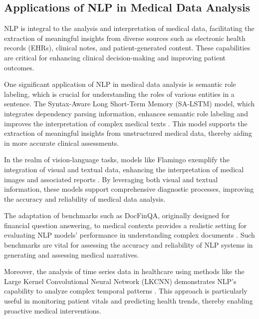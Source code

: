 \subsection{Applications of NLP in Medical Data Analysis} \label{subsec:Applications of NLP in Medical Data Analysis}



NLP is integral to the analysis and interpretation of medical data, facilitating the extraction of meaningful insights from diverse sources such as electronic health records (EHRs), clinical notes, and patient-generated content. These capabilities are critical for enhancing clinical decision-making and improving patient outcomes.



One significant application of NLP in medical data analysis is semantic role labeling, which is crucial for understanding the roles of various entities in a sentence. The Syntax-Aware Long Short-Term Memory (SA-LSTM) model, which integrates dependency parsing information, enhances semantic role labeling and improves the interpretation of complex medical texts \cite{qian2017syntaxawarelstmmodel}. This model supports the extraction of meaningful insights from unstructured medical data, thereby aiding in more accurate clinical assessments.



In the realm of vision-language tasks, models like Flamingo exemplify the integration of visual and textual data, enhancing the interpretation of medical images and associated reports \cite{alayrac2022flamingo}. By leveraging both visual and textual information, these models support comprehensive diagnostic processes, improving the accuracy and reliability of medical data analysis.



The adaptation of benchmarks such as DocFinQA, originally designed for financial question answering, to medical contexts provides a realistic setting for evaluating NLP models' performance in understanding complex documents \cite{reddy2024docfinqalongcontextfinancialreasoning}. Such benchmarks are vital for assessing the accuracy and reliability of NLP systems in generating and assessing medical narratives.



Moreover, the analysis of time series data in healthcare using methods like the Large Kernel Convolutional Neural Network (LKCNN) demonstrates NLP's capability to analyze complex temporal patterns \cite{boull2019classificationchaotictimeseries}. This approach is particularly useful in monitoring patient vitals and predicting health trends, thereby enabling proactive medical interventions.



